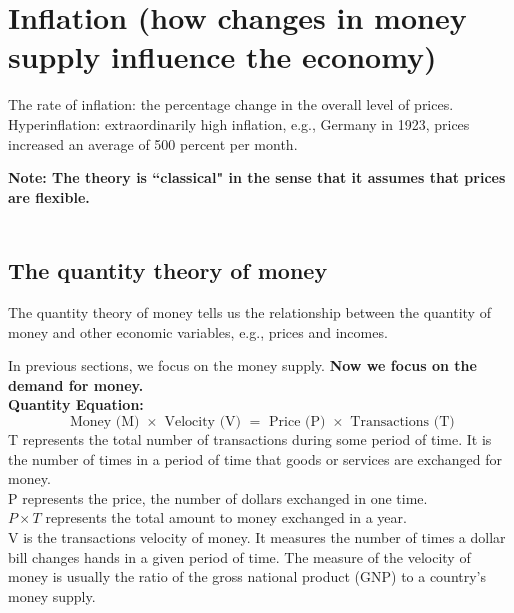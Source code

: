 \documentclass[12pt]{article}
\begin{document}
\section{Inflation (how changes in money supply influence the economy)}


The rate of inflation: the percentage change in the overall level of prices.\\
Hyperinflation: extraordinarily high inflation, e.g., Germany in 1923,
prices increased an average of 500 percent per month.

{\textbf {Note: The theory is ``classical" in the sense that it assumes that prices
are flexible.}}\\

\noindent{}\\



\subsection{The quantity theory of money}

The quantity theory of money tells us the relationship between the quantity of 
money and other economic variables, e.g., prices and incomes.

In previous sections, we focus on the money supply. {\textbf {Now we focus on
the demand for money.}}\\


{\textbf {Quantity Equation:}}
\begin{equation*}
		\text{ Money (M) } \times \text{ Velocity (V) } = \text{ Price (P) }  \times 
		\text{ Transactions (T)}
\end{equation*}
T represents the total number of transactions during some period of time. It
is the number of times in a period of time that goods or services are exchanged for 
money.\\
P represents the price, the number of dollars exchanged in one time.\\
$ P  \times T $ represents the total amount to money exchanged in a year.\\

V is the transactions velocity of money. It measures the number of times a dollar
bill changes hands in a given period of time.
The measure of the velocity of money is usually the ratio of the gross national 
product (GNP) to a country's money supply. \\
\end{document}
